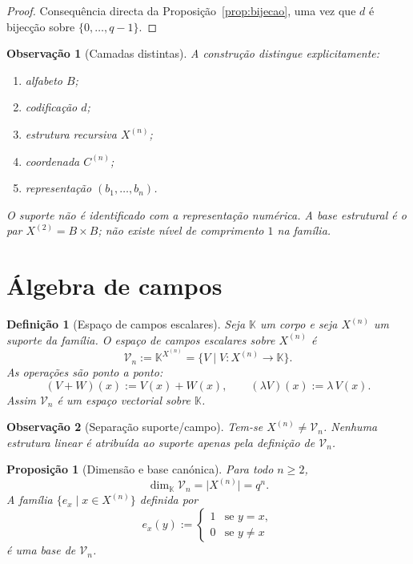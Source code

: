 \documentclass[11pt,a4paper]{article}
\newtheorem{definicao}{Definição}
\newtheorem{proposicao}{Proposição}
\newtheorem{observacao}{Observação}
\begin{document}
\begin{proof}
Consequência directa da Proposição~\ref{prop:bijecao}, uma vez que \(d\) é
bijecção sobre \(\{0,\dots,q-1\}\).
\end{proof}

\begin{observacao}[Camadas distintas]
\label{obs:camadas}
A construção distingue explicitamente:
\begin{enumerate}[leftmargin=1.5em]
\item alfabeto \(B\);
\item codificação \(d\);
\item estrutura recursiva \(X^{(n)}\);
\item coordenada \(C^{(n)}\);
\item representação \((b_1,\dots,b_n)\).
\end{enumerate}
O suporte não é identificado com a representação numérica.
A base estrutural é o par \(X^{(2)}=B\times B\); não existe nível de
comprimento \(1\) na família.
\end{observacao}

\section{Álgebra de campos}
\label{sec:campos}

\begin{definicao}[Espaço de campos escalares]
\label{def:espaco-campos}
Seja \(\mathbb K\) um corpo e seja \(X^{(n)}\) um suporte da família.
O espaço de campos escalares sobre \(X^{(n)}\) é
\[
\mathcal V_n := \mathbb K^{X^{(n)}}
= \{V\mid V\colon X^{(n)}\to\mathbb K\}.
\]
As operações são ponto a ponto:
\[
(V+W)(x) := V(x)+W(x),
\qquad
(\lambda V)(x) := \lambda\, V(x).
\]
Assim \(\mathcal V_n\) é um espaço vectorial sobre \(\mathbb K\).
\end{definicao}

\begin{observacao}[Separação suporte/campo]
\label{obs:suporte-campo}
Tem-se \(X^{(n)}\neq\mathcal V_n\).
Nenhuma estrutura linear é atribuída ao suporte apenas pela definição de
\(\mathcal V_n\).
\end{observacao}

\begin{proposicao}[Dimensão e base canónica]
\label{prop:dimensao}
Para todo \(n\ge 2\),
\[
\dim_{\mathbb K}\mathcal V_n = \lvert X^{(n)}\rvert = q^n.
\]
A família \(\{e_x\mid x\in X^{(n)}\}\) definida por
\[
e_x(y) :=
\begin{cases}
1 & \text{se }y=x,\\
0 & \text{se }y\neq x
\end{cases}
\]
é uma base de \(\mathcal V_n\).
\end{proposicao}
\end{document}
